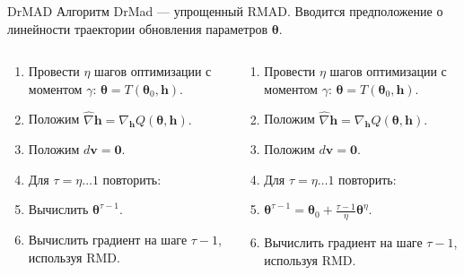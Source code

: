 \documentclass[10pt,pdf,utf8,russian,aspectratio=169]{beamer}
\begin{document}
\begin{frame}{DrMAD}
Алгоритм DrMad --- упрощенный RMAD. 
Вводится предположение о линейности траектории обновления параметров $\boldsymbol{\theta}$.
\begin{columns}
\begin{column}{0.5\textwidth}
\begin{enumerate}
\item Провести $\eta$ шагов оптимизации с моментом $\gamma$: $\boldsymbol{\theta} = T(\boldsymbol{\theta}_0, \mathbf{h})$.
\item Положим $\hat{\nabla} \mathbf{h} = \nabla_\mathbf{h} Q(\boldsymbol{\theta}, \mathbf{h}).$ 
\item Положим $d\mathbf{v} = \mathbf{0}.$
\item Для $\tau = \eta \dots 1 $ повторить:
\item \quad Вычислить $\boldsymbol{\theta}^{\tau-1}$.
\item \quad Вычислить градиент на шаге $\tau-1$, используя RMD.
\end{enumerate}
\end{column}
\begin{column}{0.5\textwidth}
\begin{enumerate}
\item Провести $\eta$ шагов оптимизации с моментом $\gamma$: $\boldsymbol{\theta} = T(\boldsymbol{\theta}_0, \mathbf{h})$.
\item Положим $\hat{\nabla} \mathbf{h} = \nabla_\mathbf{h} Q(\boldsymbol{\theta}, \mathbf{h}).$ 
\item Положим $d\mathbf{v} = \mathbf{0}.$
\item Для $\tau = \eta \dots 1 $ повторить:
\item $\boldsymbol{\theta}^{\tau-1} = \boldsymbol{\theta}_0 + \frac{\tau-1}{\eta} \boldsymbol{\theta}^{\eta}.$
\item \quad Вычислить градиент на шаге $\tau-1$, используя RMD.
\end{enumerate}

\end{column}
\end{columns}
\end{frame}
\end{document}
